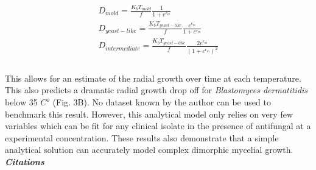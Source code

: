 \documentclass[preprint,12pt]{elsarticle}
\begin{document}
\begin{equation}
\begin{aligned}
D_{mold} = \frac{K_{b}T_{mold}}{f}\frac{1}{1+e^{\epsilon_m}} \\ 
D_{yeast-like} = \frac{K_{b}T_{yeast-like}}{f}\frac{e^{\epsilon_m}}{1+e^{\epsilon_m}} \\
D_{intermediate} = \frac{K_{b}T_{yeast-like}}{f}\frac{2e^{\epsilon_m}}{(1+e^{\epsilon_m})^{2}} \\
\end{aligned}
\end{equation}
\\
This allows for an estimate of the radial growth over time at each temperature. This also predicts a dramatic radial growth drop off for \textit{Blastomyces dermatitidis} below 35 $C^{o}$ (Fig. 3B). No dataset known by the author can be used to benchmark this result. However, this analytical model only relies on very few variables which can be fit for any clinical isolate in the presence of antifungal at a experimental concentration. These results also demonstrate that a simple analytical solution can accurately model complex dimorphic mycelial growth.  \\
 
\textbf{\textit{Citations}}

 
\end{document}
